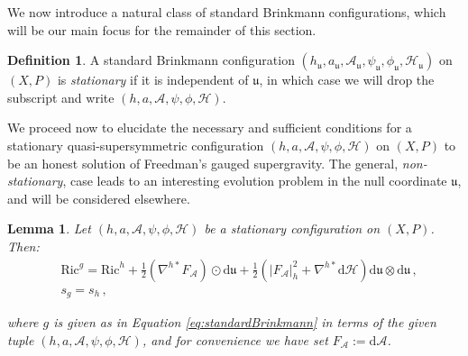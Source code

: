 \documentclass[10pt,a4paper,twoside,reqno]{amsart}
\theoremstyle{plain}
\newtheorem{lemma}[thm]{Lemma}
\theoremstyle{definition}
\newtheorem{definition}[thm]{Definition}
\theoremstyle{remark}
\def\dd{\mathrm{d}}
\def\cH{\mathcal{H}}
\def\cA{\mathcal{A}}
\def\cH{\mathcal{H}}
\def\dd{\mathrm{d}}
\def\fru{\mathfrak{u}}
\begin{document}
\noindent
We now introduce a natural class of standard Brinkmann configurations, which will be our main focus for the remainder of this section. 

\begin{definition}
A standard Brinkmann configuration $(h_{\fru}, a_{\fru}, \cA_{\fru}, \psi_{\fru}, \phi_{\fru}, \cH_{\fru})$ on $(X,P)$ is \emph{stationary} if it is independent of $\fru$, in which case we will drop the subscript and write $(h, a, \cA, \psi, \phi, \cH)$.
\end{definition}

We proceed now to elucidate the necessary and sufficient conditions for a stationary quasi-supersymmetric configuration $(h, a, \cA, \psi, \phi, \cH)$ on $(X,P)$ to be an honest solution of Freedman's gauged supergravity. The general, \emph{non-stationary}, case leads to an interesting evolution problem in the null coordinate $\fru$, and will be considered elsewhere.

\begin{lemma}
\label{lemma:curvatureBrinkmann}
Let $(h, a, \cA, \psi, \phi, \cH)$ be a stationary configuration on $(X,P)$. Then:
\begin{eqnarray*}
& \mathrm{Ric}^g = \mathrm{Ric}^{h} + \frac{1}{2}(\nabla^{h\ast} F_{\cA}) \odot \dd \fru + \frac{1}{2} \left( \vert F_{\cA}\vert^2_{h} + \nabla^{h\ast}\dd \cH  \right) \dd \fru \otimes \dd \fru \, , \\%
& s_g = s_{h} \, ,
\end{eqnarray*}

\noindent
where $g$ is given as in Equation \eqref{eq:standardBrinkmann} in terms of the given tuple $(h, a, \cA, \psi, \phi, \cH)$, and for convenience we have set $F_{\cA} := \dd\cA$. 
\end{lemma}
\end{document}
